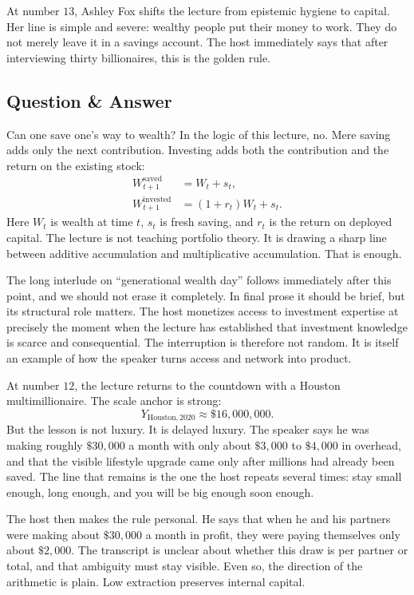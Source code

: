 At number \(13\), Ashley Fox shifts the lecture from epistemic hygiene to capital. Her line is simple and severe: wealthy people put their money to work. They do not merely leave it in a savings account. The host immediately says that after interviewing thirty billionaires, this is the golden rule.

\subsection{Question \& Answer}

Can one save one's way to wealth? In the logic of this lecture, no. Mere saving adds only the next contribution. Investing adds both the contribution and the return on the existing stock:
\begin{align}
W_{t+1}^{\mathrm{saved}} &= W_t + s_t, \\
W_{t+1}^{\mathrm{invested}} &= (1+r_t)W_t + s_t.
\end{align}
Here \(W_t\) is wealth at time \(t\), \(s_t\) is fresh saving, and \(r_t\) is the return on deployed capital. The lecture is not teaching portfolio theory. It is drawing a sharp line between additive accumulation and multiplicative accumulation. That is enough.

The long interlude on ``generational wealth day'' follows immediately after this point, and we should not erase it completely. In final prose it should be brief, but its structural role matters. The host monetizes access to investment expertise at precisely the moment when the lecture has established that investment knowledge is scarce and consequential. The interruption is therefore not random. It is itself an example of how the speaker turns access and network into product.

At number \(12\), the lecture returns to the countdown with a Houston multimillionaire. The scale anchor is strong:
\begin{equation}
Y_{\mathrm{Houston},2020} \approx \$16{,}000{,}000.
\end{equation}
But the lesson is not luxury. It is delayed luxury. The speaker says he was making roughly \(\$30{,}000\) a month with only about \(\$3{,}000\) to \(\$4{,}000\) in overhead, and that the visible lifestyle upgrade came only after millions had already been saved. The line that remains is the one the host repeats several times: stay small enough, long enough, and you will be big enough soon enough.

The host then makes the rule personal. He says that when he and his partners were making about \(\$30{,}000\) a month in profit, they were paying themselves only about \(\$2{,}000\). The transcript is unclear about whether this draw is per partner or total, and that ambiguity must stay visible. Even so, the direction of the arithmetic is plain. Low extraction preserves internal capital.

